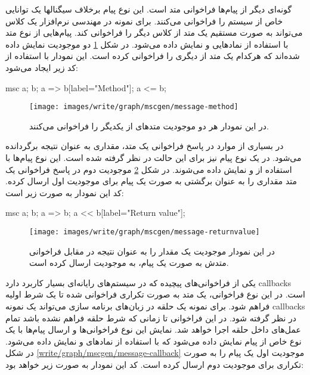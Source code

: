 گونه‌ای دیگر از پیام‌ها فراخوانی متد است. این نوع پیام برخلاف سیگنالها یک
توانایی خاص از سیستم را فراخوانی می‌کنند. برای نمونه در مهندسی نرم‌افزار یک کلاس
می‌تواند به صورت مستقیم یک متد از کلاس دیگر را فراخوانی کند. پیام‌هایی از نوع
متد با استفاده از نماد‌هایی \lr{=>} و \lr{<=} نمایش داده می‌شود. در شکل
\ref{write/graph/mscgen/message-method} دو موجودیت نمایش داده شده‌اند که هرکدام
یک متد از دیگری را فراخوانی کرده است.
این نمودار با استفاده از کد زیر ایجاد می‌شود:

\begin{MSC}
msc{
	a;
	b;
	a => b[label="Method"];
	a <= b;
}
\end{MSC}

\begin{figure}[h]
\centering
\texttt{[image: images/write/graph/mscgen/message-method]}
\caption[پیام نوع متد]{
	در این نمودار هر دو موجودیت متدهای از یکدیگر را فراخوانی
	می‌کنند.
}
\label{write/graph/mscgen/message-method}
\end{figure}

در بسیاری از موارد در پاسخ فراخوانی یک متد، مقداری به عنوان نتیجه برگردانده
می‌شود. در  یک نوع پیام نیز برای این حالت در نظر گرفته شده است. این
نوع پیام‌ها با استفاده از \lr{>>} و \lr{<<} نمایش داده می‌شوند. در شکل
\ref{write/graph/mscgen/message-returnvalue} موجودیت دوم در پاسخ فراخوانی یک
متد مقداری را به عنوان برگشتی به صورت یک پیام برای موجودیت اول ارسال کرده. کد
این نمودار به صورت زیر است:

\begin{MSC}
msc{
	a;
	b;
	a => b;
	a << b[label="Return value"];
}
\end{MSC}

\begin{figure}[h]
\centering
\texttt{[image: images/write/graph/mscgen/message-returnvalue]}
\caption[مقدار برگشتی به صورت یک پیام]{
	در این نمودار موجودیت  یک مقدار را به عنوان نتیجه در مقابل فراخوانی متدش
	به صورت یک پیام، به موجودیت  ارسال کرده است.
	}
\label{write/graph/mscgen/message-returnvalue}
\end{figure}

یکی از فراخوانی‌های پیچیده که در سیستم‌های رایانه‌ای بسیار کاربرد دارد
\glspl{callback} است.
در این نوع فراخوانی، یک متد به صورت تکراری فراخوانی شده تا یک شرط اولیه فراهم
شود. برای نمونه یک حلقه در زبان‌های برنامه سازی می‌تواند یک نمونه
\glspl{callback} در نظر گرفته شود. در این فراخوانی تا زمانی که شرط حلقه فراهم
نشده باشد تمام عمل‌های داخل حلقه اجرا خواهد شد. نمایش این نوع فراخوانی‌ها و
ارسال پیام‌ها با یک نوع خاص از پیام نمایش داده می‌شود که با استفاده از نمادهای
\lr{=>>} و \lr{<<=} نمایش داده می‌شود. در شکل
\ref{write/graph/mscgen/message-callback} موجودیت اول یک پیام را به صورت تکراری
برای  موجودیت دوم ارسال کرده است.
کد این نمودار به صورت زیر خواهد بود:

